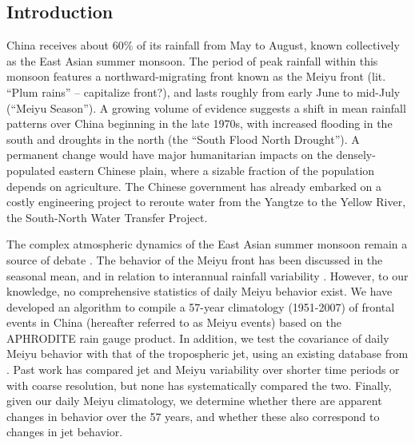 \documentclass[draft,grl]{AGUTeX}
\begin{document}
\begin{article}



\section{Introduction}
 
 China receives about 60\% of its rainfall from May to August, known collectively as the East Asian summer monsoon. The period of peak rainfall within this monsoon features a northward-migrating front known as the Meiyu front (lit. ``Plum rains''  -- capitalize front?), and lasts roughly from early June to mid-July (``Meiyu Season''). A growing volume of evidence suggests a shift in mean rainfall patterns over China beginning in the late 1970s, with increased flooding in the south and droughts in the north (the ``South Flood North Drought''). A permanent change would have major humanitarian impacts on the densely-populated eastern Chinese plain, where a sizable fraction of the population depends on agriculture. The Chinese government has already embarked on a costly engineering project to reroute water from the Yangtze to the Yellow River, the South-North Water Transfer Project.
 
	The complex atmospheric dynamics of the East Asian summer monsoon remain a source of debate \citep{Sampe2010,Chen2014}. The behavior of the Meiyu front has been discussed in the seasonal mean\citep{Ding2005}, and in relation to interannual rainfall variability \citep{Kosaka2011}. However, to our knowledge, no comprehensive statistics of daily Meiyu behavior exist. We have developed an algorithm to compile a 57-year climatology (1951-2007) of frontal events in China (hereafter referred to as Meiyu events) based on the APHRODITE rain gauge product. In addition, we test the covariance of daily Meiyu behavior with that of the tropospheric jet, using an existing database from \citet{Schiemann2009}. Past work has compared jet and Meiyu variability over shorter time periods or with coarse resolution\cite{Liang1998}, but none has systematically compared the two.  Finally, given our daily Meiyu climatology, we determine whether there are apparent changes in behavior over the 57 years, and whether these also correspond to changes in jet behavior.



\end{article}
\end{document}
